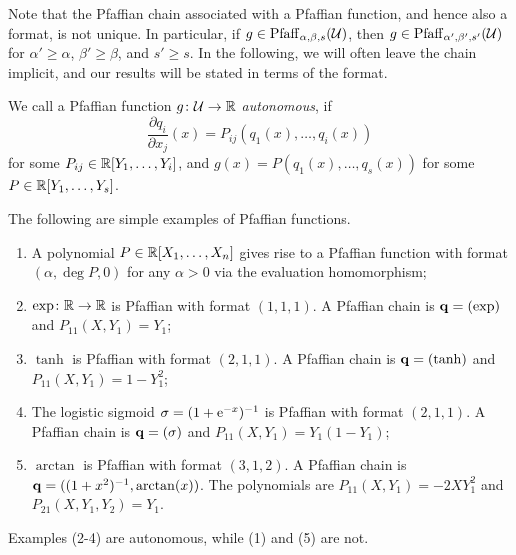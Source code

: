 \begin{remark}
 Note that the Pfaffian chain associated with a Pfaffian function, and hence also a format, is not unique. In particular, if $g\in \mathrm{Pfaff}_{\alpha,\beta,s}(\mathcal{U})$, then $g\in \mathrm{Pfaff}_{\alpha',\beta',s'}(\mathcal{U})$ for $\alpha'\geq \alpha$, $\beta'\geq \beta$, and $s'\geq s$. In the following, we will often leave the chain implicit, and our results will be stated in terms of the format.
\end{remark}

We call a Pfaffian function $g\colon \mathcal{U}\to \mathbb{R}$ \emph{autonomous}, if 
\begin{equation}\label{eq:simplepfaff}
  \frac{\partial q_i}{\partial x_j}(x) = P_{ij}(q_1(x),\dots,q_i(x))
\end{equation}
for some $P_{ij}\in \mathbb{R}[Y_1,\dots,Y_i]$, and $g(x)=P(q_1(x), \dots, q_s(x))$ for some $P\in \mathbb{R}[Y_1,\dots,Y_s]$.

\begin{example}\label{ex:1} The following are simple examples of Pfaffian functions.
        \begin{enumerate}
            \item A polynomial $P \in \mathbb{R}[X_1, \dots, X_n]$ gives rise to a Pfaffian function with format $(\alpha,\deg P,0)$ for any $\alpha>0$ via the evaluation homomorphism;
            \item $\exp\colon \mathbb{R}\to \mathbb{R}$ is Pfaffian with format $(1,1,1)$. A Pfaffian chain is $\mathbf{q}=(\exp)$ and $P_{11}(X,Y_1)=Y_1$;
            \item $\tanh$ is Pfaffian with format $(2,1,1)$. A Pfaffian chain is $\mathbf{q}=(\tanh)$ and $P_{11}(X,Y_1)=1-Y_1^2$;
            \item The logistic sigmoid $\sigma = (1 + \mathrm{e}^{-x})^{-1}$ is Pfaffian with format $(2, 1, 1)$. A Pfaffian chain is $\mathbf{q}=(\sigma)$ and $P_{11}(X,Y_1)=Y_1(1-Y_1)$;
            \item $\arctan$ is Pfaffian with format $(3, 1, 2)$. A Pfaffian chain is $\mathbf{q}=((1+x^2)^{-1},\arctan(x))$. The polynomials are $P_{11}(X,Y_1) = -2XY_1^2$ and $P_{21}(X,Y_1,Y_2)=Y_1$. 
        \end{enumerate}
Examples (2-4) are autonomous, while (1) and (5) are not.
\end{example}


